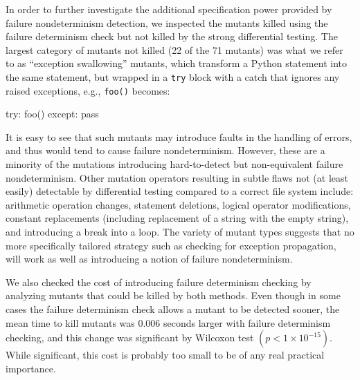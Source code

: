 In order to further investigate the additional specification power
provided by failure nondeterminism detection, we inspected the mutants
killed using the failure determinism check but not killed by the
strong differential testing.  The largest category of mutants not
killed (22 of the 71 mutants) was what we refer to as ``exception
swallowing'' mutants, which transform a Python statement into the same
statement, but wrapped in a {\tt try} block with a catch that ignores
any raised exceptions, e.g., {\tt foo()} becomes:

\begin{code}
try: foo()
except: pass
\end{code}

\noindent It is easy to
see that such mutants may introduce faults in the handling of
errors, and thus would tend to cause failure nondeterminism.  However,
these are a minority of the mutations introducing hard-to-detect but
non-equivalent failure
nondeterminism.  Other mutation operators resulting in subtle flaws
not (at least easily) detectable by differential testing compared to a
correct file system include:  arithmetic operation changes, statement
deletions, logical operator modifications, constant replacements
(including replacement of a string with the empty string), and
introducing a break into a loop.  The variety of mutant types suggests
that no more specifically tailored strategy such as checking for
exception propagation, will work as well as introducing a notion of
failure nondeterminism.

We also checked the cost of introducing failure determinism checking
by analyzing mutants that could be killed by both methods.  Even
though in some cases the failure determinism check allows a mutant to
be detected sooner, the mean time to kill mutants was 0.006 seconds
larger with failure determinism checking, and this change was significant by Wilcoxon test
$(p < 1 \times 10^{-15})$.  While significant, this cost is probably
too small to be of any real practical importance.
